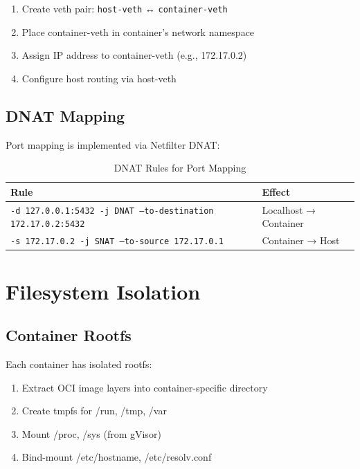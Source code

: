 \documentclass[12pt,twoside,openright]{book}
\theoremstyle{plain}
\theoremstyle{definition}
\theoremstyle{remark}
\begin{document}
\begin{enumerate}
  \item Create veth pair: \texttt{host-veth} ↔ \texttt{container-veth}
  \item Place container-veth in container's network namespace
  \item Assign IP address to container-veth (e.g., 172.17.0.2)
  \item Configure host routing via host-veth
\end{enumerate}

\subsection{DNAT Mapping}

Port mapping is implemented via Netfilter DNAT:

\begin{table}[H]
\centering
\begin{tabular}{|l|l|}
\hline
\textbf{Rule} & \textbf{Effect} \\
\hline
\texttt{-d 127.0.0.1:5432 -j DNAT --to-destination 172.17.0.2:5432} & Localhost → Container \\
\hline
\texttt{-s 172.17.0.2 -j SNAT --to-source 172.17.0.1} & Container → Host \\
\hline
\end{tabular}
\caption{DNAT Rules for Port Mapping}
\label{tab:dnat_rules}
\end{table}

\section{Filesystem Isolation}

\subsection{Container Rootfs}

Each container has isolated rootfs:

\begin{enumerate}
  \item Extract OCI image layers into container-specific directory
  \item Create tmpfs for /run, /tmp, /var
  \item Mount /proc, /sys (from gVisor)
  \item Bind-mount /etc/hostname, /etc/resolv.conf
\end{enumerate}
\end{document}
